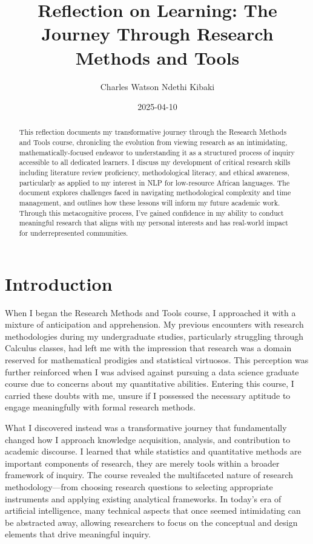 \documentclass[
]{article}
\title{Reflection on Learning: The Journey Through Research Methods and
Tools}
\author{Charles Watson Ndethi Kibaki}
\date{2025-04-10}
\begin{document}
\maketitle
\begin{abstract}
This reflection documents my transformative journey through the Research
Methods and Tools course, chronicling the evolution from viewing
research as an intimidating, mathematically-focused endeavor to
understanding it as a structured process of inquiry accessible to all
dedicated learners. I discuss my development of critical research skills
including literature review proficiency, methodological literacy, and
ethical awareness, particularly as applied to my interest in NLP for
low-resource African languages. The document explores challenges faced
in navigating methodological complexity and time management, and
outlines how these lessons will inform my future academic work. Through
this metacognitive process, I've gained confidence in my ability to
conduct meaningful research that aligns with my personal interests and
has real-world impact for underrepresented communities.
\end{abstract}


\section{Introduction}\label{introduction}

When I began the Research Methods and Tools course, I approached it with
a mixture of anticipation and apprehension. My previous encounters with
research methodologies during my undergraduate studies, particularly
struggling through Calculus classes, had left me with the impression
that research was a domain reserved for mathematical prodigies and
statistical virtuosos. This perception was further reinforced when I was
advised against pursuing a data science graduate course due to concerns
about my quantitative abilities. Entering this course, I carried these
doubts with me, unsure if I possessed the necessary aptitude to engage
meaningfully with formal research methods.

What I discovered instead was a transformative journey that
fundamentally changed how I approach knowledge acquisition, analysis,
and contribution to academic discourse. I learned that while statistics
and quantitative methods are important components of research, they are
merely tools within a broader framework of inquiry. The course revealed
the multifaceted nature of research methodology---from choosing research
questions to selecting appropriate instruments and applying existing
analytical frameworks. In today's era of artificial intelligence, many
technical aspects that once seemed intimidating can be abstracted away,
allowing researchers to focus on the conceptual and design elements that
drive meaningful inquiry.
\end{document}
